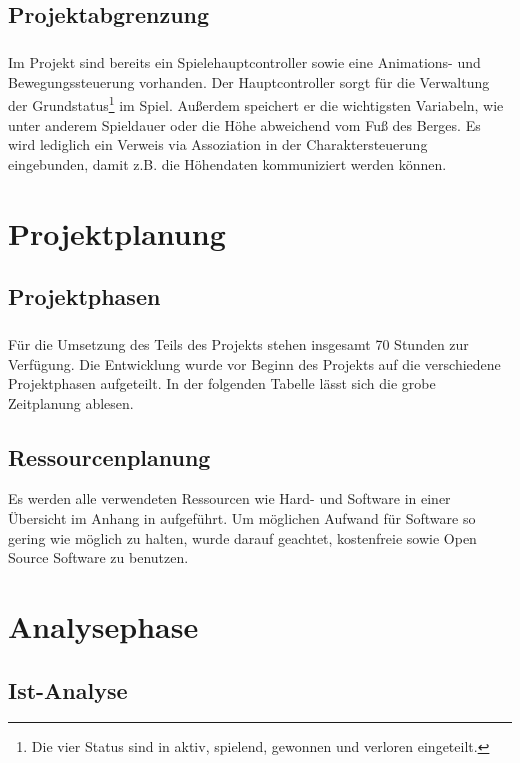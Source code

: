 \section{Projektabgrenzung}
\label{Projektabgrenzung}
\paragraph{}
Im Projekt sind bereits ein Spielehauptcontroller sowie eine Animations- und Bewegungssteuerung vorhanden.
Der Hauptcontroller sorgt für die Verwaltung der Grundstatus\footnote{Die vier Status sind in aktiv, spielend, gewonnen und verloren eingeteilt.} im Spiel. Außerdem speichert er die wichtigsten Variabeln, wie unter anderem Spieldauer oder die Höhe abweichend vom Fuß des Berges. Es wird lediglich ein Verweis via Assoziation in der Charaktersteuerung eingebunden, damit z.B. die Höhendaten kommuniziert werden können.

\chapter{Projektplanung}
\section{Projektphasen}
\paragraph{}
Für die Umsetzung des Teils des Projekts stehen insgesamt 70 Stunden zur Verfügung. Die Entwicklung wurde vor Beginn des Projekts auf die verschiedene Projektphasen aufgeteilt. In der folgenden Tabelle  lässt sich die grobe Zeitplanung ablesen.\\



\section{Ressourcenplanung}
Es werden alle verwendeten Ressourcen wie Hard- und Software in einer Übersicht im Anhang in  aufgeführt. Um möglichen Aufwand für Software so gering wie möglich zu halten, wurde darauf geachtet, kostenfreie sowie Open Source Software zu benutzen.

\chapter{Analysephase}
\section{Ist-Analyse}
